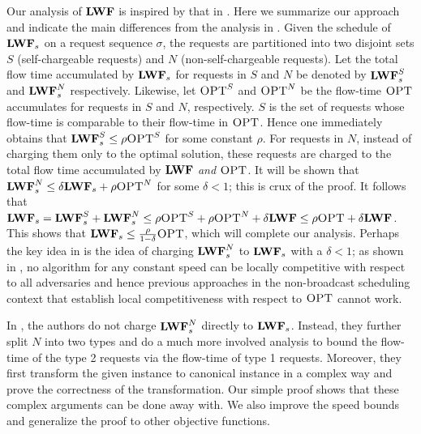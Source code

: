 \documentclass[11pt]{article}
\newcommand{\opt}{\textrm{\sc OPT}}
\newcommand{\len}{\mathfrak{\rho}}
\newcommand{\spone}{-3.5mm}
\begin{document}
\begin{titlepage}
Our analysis of ${\texttt{\bf{LWF}}}$ is inspired by that in \cite{EdmondsP04}.  Here we summarize our approach and indicate the main
differences from the analysis in \cite{EdmondsP04}. Given the schedule of ${\texttt{\bf{LWF}}}_s$ on a request sequence $\sigma$, the
requests are partitioned into two disjoint sets $S$ (self-chargeable requests) and $N$ (non-self-chargeable requests).
Let the total flow time accumulated by ${\texttt{\bf{LWF}}}_s$ for requests in $S$ and $N$ be denoted by ${\texttt{\bf{LWF}}}_s^{S}$ and ${\texttt{\bf{LWF}}}_s^{N}$
respectively. Likewise, let $\opt^S$ and $\opt^N$ be the flow-time $\opt$ accumulates for requests in $S$ and $N$,
respectively. $S$ is the set of requests whose flow-time is comparable to their flow-time in $\opt$. Hence one
immediately obtains that $\lwf_s^{S} \le \len \opt^S$ for some constant $\len$.  For requests in $N$, instead of
charging them only to the optimal solution, these requests are charged to the total flow time accumulated by ${\texttt{\bf{LWF}}}$
{\em
  and} $\opt$. It will be shown that $\lwf_s^{N} \leq \delta \lwf_s +
\len \opt^N$ for some $\delta < 1$; this is crux of the proof. It follows that $\lwf_s = \lwf_s^{S} + \lwf_s^{N} \leq
\len \opt^S + \len \opt^N + \delta \lwf \leq \len \opt + \delta \lwf$. This shows that $\lwf_s \leq
\frac{\len}{1-\delta} \opt$, which will complete our analysis. Perhaps the key idea in \cite{EdmondsP04} is the idea of
charging ${\texttt{\bf{LWF}}}_s^N$ to ${\texttt{\bf{LWF}}}_s$ with a $\delta < 1$; as shown in \cite{KalyanasundaramPV00}, no algorithm for any
constant speed can be locally competitive with respect to all adversaries and hence previous approaches in the
non-broadcast scheduling context that establish local competitiveness with respect to $\opt$ cannot work.

In \cite{EdmondsP04}, the authors do not charge ${\texttt{\bf{LWF}}}_s^N$ directly to ${\texttt{\bf{LWF}}}_s$. Instead, they further split $N$ into
two types and do a much more involved analysis to bound the flow-time of the type 2 requests via the flow-time of type
1 requests. Moreover, they first transform the given instance to canonical instance in a complex way and prove the
correctness of the transformation. Our simple proof shows that these complex arguments can be done away with. We also
improve the speed bounds and generalize the proof to other objective functions. \vspace{\spone}


\end{titlepage}
\end{document}
